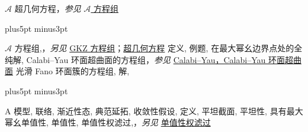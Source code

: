 \clearpage
\begingroup
\makeatletter
{}
\def\indexname{索引}
\def\imki@maybeaddtotoc{\phantomsection\addcontentsline{toc}{chapter}{索引}}
\makeatother
\setlength{\multicolsep}{8pt}
\begin{theindex}
\raggedcolumns
\renewcommand{\indexspace}{\par\vskip9.5pt plus5pt minus3pt\relax}
\item \leavevmode\hypertarget{source:476}{}\hypertarget{idx:0038}{$\mathcal A$ 超几何方程}，\textit{参见} \hyperlink{idx:0055}{$\mathcal A$ 方程组}
\indexspace
\item \leavevmode\hypertarget{idx:0055}{$\mathcal A$ 方程组},\enspace{}，\textit{另见} \hyperlink{idx:0449}{GKZ 方程组}；\hyperlink{idx:0615}{超几何方程}
\subitem \leavevmode\hypertarget{idx:0056}{定义},\enspace{}
\subitem \leavevmode\hypertarget{idx:0057}{例题},\enspace{}
\subitem \leavevmode\hypertarget{idx:0058}{在最大幂幺边界点处的全纯解},\enspace{}
\subitem \leavevmode\hypertarget{idx:0059}{Calabi--Yau 环面超曲面的方程组}，\textit{参见} \hyperlink{idx:0099}{Calabi--Yau，Calabi--Yau 环面超曲面}
\subitem \leavevmode\hypertarget{idx:0060}{光滑 Fano 环面簇的方程组},\enspace{}
\subitem \leavevmode\hypertarget{idx:0061}{解},\enspace{}
\indexspace
\item \leavevmode\hypertarget{idx:0002}{A 模型},\enspace{}
\subitem \leavevmode\hypertarget{idx:0003}{联络},\enspace{}
\subsubitem \leavevmode\hypertarget{idx:0004}{渐近性态},\enspace{}
\subsubitem \leavevmode\hypertarget{idx:0005}{典范延拓},\enspace{}
\subsubitem \leavevmode\hypertarget{idx:0006}{收敛性假设},\enspace{}
\subsubitem \leavevmode\hypertarget{idx:0007}{定义},\enspace{}
\subsubitem \leavevmode\hypertarget{idx:0008}{平坦截面},\enspace{}
\subsubitem \leavevmode\hypertarget{idx:0009}{平坦性},\enspace{}
\subsubitem \leavevmode\hypertarget{idx:0010}{具有最大幂幺单值性},\enspace{}
\subsubitem \leavevmode\hypertarget{idx:0011}{单值性},\enspace{}
\subsubitem \leavevmode\hypertarget{idx:0012}{单值性权滤过},\enspace{}，\textit{另见} \hyperlink{idx:0907}{单值性权滤过}

\end{theindex}
